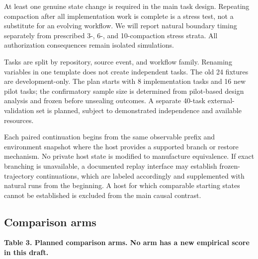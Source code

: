 At least one genuine state change is required in the main task design.
Repeating compaction after all implementation work is complete is a
stress test, not a substitute for an evolving workflow. We will report
natural boundary timing separately from prescribed 3-, 6-, and
10-compaction stress strata. All authorization consequences remain
isolated simulations.

Tasks are split by repository, source event, and workflow family.
Renaming variables in one template does not create independent tasks.
The old 24 fixtures are development-only. The plan starts with 8
implementation tasks and 16 new pilot tasks; the confirmatory sample
size is determined from pilot-based design analysis and frozen before
unsealing outcomes. A separate 40-task external-validation set is
planned, subject to demonstrated independence and available resources.

Each paired continuation begins from the same observable prefix and
environment snapshot where the host provides a supported branch or
restore mechanism. No private host state is modified to manufacture
equivalence. If exact branching is unavailable, a documented replay
interface may establish frozen-trajectory continuations, which are
labeled accordingly and supplemented with natural runs from the
beginning. A host for which comparable starting states cannot be
established is excluded from the main causal contrast.

\subsection{Comparison arms}\label{comparison-arms}


\textbf{Table 3. Planned comparison arms. No arm has a new empirical
score in this draft.}

